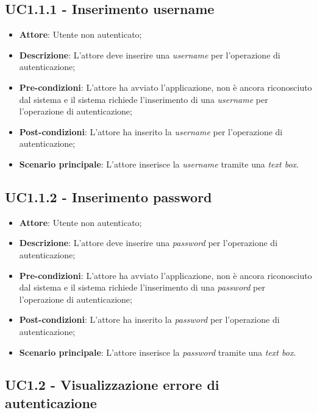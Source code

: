 \subsection{UC1.1.1 - Inserimento username}

\begin{itemize}
	\item \textbf{Attore}: Utente non autenticato;
	\item \textbf{Descrizione}: L'attore deve inserire una \textit{username} per l'operazione di autenticazione;
	\item \textbf{Pre-condizioni}: L'attore ha avviato l'applicazione, non è ancora riconosciuto dal sistema e il sistema richiede l'inserimento di una \textit{username} per l'operazione di autenticazione;
	\item \textbf{Post-condizioni}: L'attore ha inserito la \textit{username} per l'operazione di autenticazione;
	\item \textbf{Scenario principale}: L'attore inserisce la \textit{username} tramite una \textit{text box}.
\end{itemize}

\subsection{UC1.1.2 - Inserimento password}

\begin{itemize}
	\item \textbf{Attore}: Utente non autenticato;
	\item \textbf{Descrizione}: L'attore deve inserire una \textit{password} per l'operazione di autenticazione;
	\item \textbf{Pre-condizioni}: L'attore ha avviato l'applicazione, non è ancora riconosciuto dal sistema e il sistema richiede l'inserimento di una \textit{password} per l'operazione di autenticazione;
	\item \textbf{Post-condizioni}: L'attore ha inserito la \textit{password} per l'operazione di autenticazione;
	\item \textbf{Scenario principale}: L'attore inserisce la \textit{password} tramite una \textit{text box}.
\end{itemize}

\subsection{UC1.2 - Visualizzazione errore di autenticazione}

